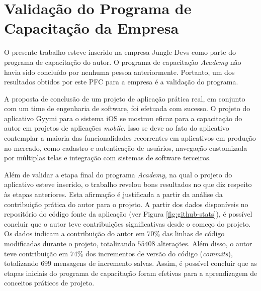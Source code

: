 \section{Validação do Programa de Capacitação da Empresa}
O presente trabalho esteve inserido na empresa Jungle Devs como parte do programa de capacitação do autor. O programa de capacitação \textit{Academy} não havia sido concluído por nenhuma pessoa anteriormente. Portanto, um dos resultados obtidos por este PFC para a empresa é a validação do programa.

A proposta de conclusão de um projeto de aplicação prática real, em conjunto com um time de engenharia de software, foi efetuada com sucesso. O projeto do aplicativo Gyymi para o sistema iOS se mostrou eficaz para a capacitação do autor em projetos de aplicações \textit{mobile}. Isso se deve ao fato do aplicativo contemplar a maioria das funcionalidades recorrentes em aplicativos em produção no mercado, como cadastro e autenticação de usuários, navegação customizada por múltiplas telas e integração com sistemas de software terceiros.

Além de validar a etapa final do programa \textit{Academy}, na qual o projeto do aplicativo esteve inserido, o trabalho revelou bons resultados no que diz respeito às etapas anteriores. Esta afirmação é justificada a partir da análise da contribuição prática do autor para o projeto. A partir dos dados disponíveis no repositório do código fonte da aplicação (ver Figura \ref{fig:github-stats}), é possível concluir que o autor teve contribuições significativas desde o começo do projeto. Os dados indicam a contribuição do autor em $70\%$ das linhas de código modificadas durante o projeto, totalizando $55408$ alterações. Além disso, o autor teve contribuição em $74\%$ dos incrementos de versão do código (\textit{commits}), totalizando $699$ mensagens de incremento salvas. Assim, é possível concluir que as etapas iniciais do programa de capacitação foram efetivas para a aprendizagem de conceitos práticos de projeto.

